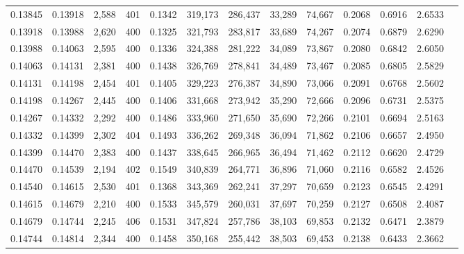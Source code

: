 \begin{tabular}{rrrrrrrrrrrrr}
0.13845 & 0.13918 & 2,588 & 401 &                                     0.1342 & 319,173 & 286,437 &  33,289 &  74,667 & 0.2068 & 0.6916 & 2.6533 \\
0.13918 & 0.13988 & 2,620 & 400 &                                     0.1325 & 321,793 & 283,817 &  33,689 &  74,267 & 0.2074 & 0.6879 & 2.6290 \\
0.13988 & 0.14063 & 2,595 & 400 &                                     0.1336 & 324,388 & 281,222 &  34,089 &  73,867 & 0.2080 & 0.6842 & 2.6050 \\
0.14063 & 0.14131 & 2,381 & 400 &                                     0.1438 & 326,769 & 278,841 &  34,489 &  73,467 & 0.2085 & 0.6805 & 2.5829 \\
0.14131 & 0.14198 & 2,454 & 401 &                                     0.1405 & 329,223 & 276,387 &  34,890 &  73,066 & 0.2091 & 0.6768 & 2.5602 \\
0.14198 & 0.14267 & 2,445 & 400 &                                     0.1406 & 331,668 & 273,942 &  35,290 &  72,666 & 0.2096 & 0.6731 & 2.5375 \\
0.14267 & 0.14332 & 2,292 & 400 &                                     0.1486 & 333,960 & 271,650 &  35,690 &  72,266 & 0.2101 & 0.6694 & 2.5163 \\
0.14332 & 0.14399 & 2,302 & 404 &                                     0.1493 & 336,262 & 269,348 &  36,094 &  71,862 & 0.2106 & 0.6657 & 2.4950 \\
0.14399 & 0.14470 & 2,383 & 400 &                                     0.1437 & 338,645 & 266,965 &  36,494 &  71,462 & 0.2112 & 0.6620 & 2.4729 \\
0.14470 & 0.14539 & 2,194 & 402 &                                     0.1549 & 340,839 & 264,771 &  36,896 &  71,060 & 0.2116 & 0.6582 & 2.4526 \\
0.14540 & 0.14615 & 2,530 & 401 &                                     0.1368 & 343,369 & 262,241 &  37,297 &  70,659 & 0.2123 & 0.6545 & 2.4291 \\
0.14615 & 0.14679 & 2,210 & 400 &                                     0.1533 & 345,579 & 260,031 &  37,697 &  70,259 & 0.2127 & 0.6508 & 2.4087 \\
0.14679 & 0.14744 & 2,245 & 406 &                                     0.1531 & 347,824 & 257,786 &  38,103 &  69,853 & 0.2132 & 0.6471 & 2.3879 \\
0.14744 & 0.14814 & 2,344 & 400 &                                     0.1458 & 350,168 & 255,442 &  38,503 &  69,453 & 0.2138 & 0.6433 & 2.3662 \\

\end{tabular}
